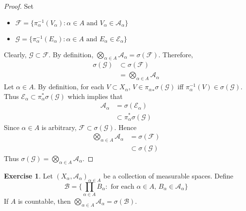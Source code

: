 \documentclass[12pt]{amsart}
\theoremstyle{definition}
\newtheorem{ex}[definition]{Exercise}
\newcommand{\al}{\alpha}
\newcommand{\sig}{\sigma}
\newcommand{\MA}{\mathcal{A}}
\newcommand{\MB}{\mathcal{B}}
\newcommand{\MF}{\mathcal{F}}
\newcommand{\MG}{\mathcal{G}}
\newcommand{\ME}{\mathcal{E}}
\begin{document}
 	\begin{proof}
 		Set 
 		\begin{itemize}
 			\item $\MF = \{\pi_{\al}^{-1}(V_{\al}): \al \in A \text{ and } V_{\al} \in \MA_{\al}\}$ 
 			\item $\MG = \{\pi_{\al}^{-1}(E_{\al}): \al \in A \text{ and } E_{\al} \in \ME_{\al}\}$
 		\end{itemize}
 		Clearly, $\MG \subset \MF$. By definition, $\bigotimes\limits_{\al \in A} \MA_{\al} = \sig(\MF)$. Therefore, 
 		\begin{align*}
 			\sig(\MG) 
 			& \subset \sig(\MF) \\
 			& = \bigotimes\limits_{\al \in A} \MA_{\al}
 		\end{align*}
 		Let $\al \in A$. By definition, for each $V \subset X_{\al}$, $V \in {\pi_{\al}}_* \sig(\MG)$ iff $\pi_{\al}^{-1}(V) \in \sig(\MG)$. Thus $\ME_{\al} \subset \pi_{\al}^* \sig(\MG)$ which implies that 
 		\begin{align*}
 			\MA_{\al} 
 			& = \sig(\ME_{\al}) \\
 			& \subset \pi_{\al}^* \sig(\MG)
 		\end{align*}
 		Since $\al \in A$ is arbitrary, $\MF \subset \sig(\MG)$. Hence 
 		\begin{align*}
 			\bigotimes\limits_{\al \in A} \MA_{\al} 
 			& = \sig(\MF) \\
 			& \subset \sig(\MG)
 		\end{align*}
 		Thus $\sig(\MG) = \bigotimes\limits_{\al \in A} \MA_{\al}$.
 	\end{proof}
 
 	\begin{ex}
 		Let $(X_{\al}, \MA_{\al})_{\al \in A}$ be a collection of measurable spaces. Define $$\MB = \bigg \{\prod_{\al \in A}B_{\al}: \text{ for each $\al \in A$, } B_{\al} \in \MA_{\al} \bigg\}$$
 		If $A$ is countable, then $\bigotimes\limits_{\al \in A} \MA_{\al} = \sig(\MB)$. 
 	\end{ex}
 	
\end{document}

